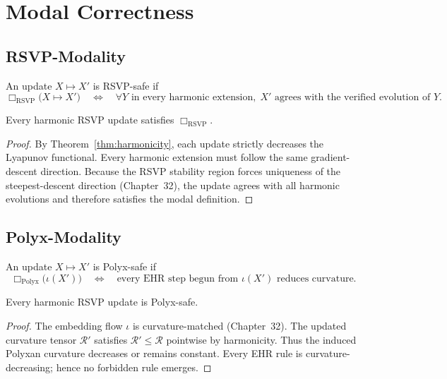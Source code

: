 \section{Modal Correctness}

\subsection{RSVP-Modality}

\begin{definition}
An update $X\mapsto X'$ is RSVP-safe if
\[
\Box_{\mathrm{RSVP}}
  \bigl(X\mapsto X'\bigr)
\quad\Longleftrightarrow\quad
\forall Y \text{ in every harmonic extension},
\; \text{$X'$ agrees with the verified evolution of $Y$.}
\]
\end{definition}

\begin{theorem}
Every harmonic RSVP update satisfies $\Box_{\mathrm{RSVP}}$.
\end{theorem}

\begin{proof}
By Theorem~\ref{thm:harmonicity}, each update strictly decreases the Lyapunov
functional.  
Every harmonic extension must follow the same gradient-descent direction.
Because the RSVP stability region forces uniqueness of the steepest-descent
direction (Chapter~32), the update agrees with all harmonic evolutions and
therefore satisfies the modal definition.
\end{proof}

\subsection{Polyx-Modality}

\begin{definition}
An update $X\mapsto X'$ is Polyx-safe if
\[
\Box_{\mathrm{Polyx}}\bigl(\iota(X')\bigr)
\quad\Longleftrightarrow\quad
\text{every EHR step begun from $\iota(X')$ reduces curvature.}
\]
\end{definition}

\begin{theorem}
Every harmonic RSVP update is Polyx-safe.
\end{theorem}

\begin{proof}
The embedding flow $\iota$ is curvature-matched (Chapter~32).  
The updated curvature tensor $\mathcal{R}'$ satisfies
$\mathcal{R}'\le\mathcal{R}$ pointwise by harmonicity.
Thus the induced Polyxan curvature decreases or remains constant.  
Every EHR rule is curvature-decreasing; hence no forbidden rule emerges.
\end{proof}

